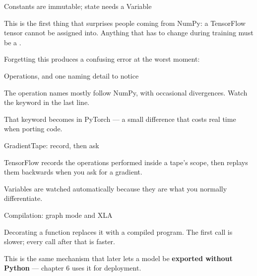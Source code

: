 \documentclass[aspectratio=169,11pt,t]{beamer}
\begin{document}

\begin{frame}[shrink=25]{Constants are immutable; state needs a Variable}
{\fontsize{9.4}{12.6}\selectfont\color{fg2}This is the first thing that surprises people coming from NumPy: a TensorFlow tensor cannot be assigned into. Anything that has to change during training must be a .\par}\vskip 4pt
\begin{iband}[amber]
Forgetting this produces a confusing error at the worst moment: 
\end{iband}
\end{frame}

\begin{frame}[shrink=25]{Operations, and one naming detail to notice}
{\fontsize{9.4}{12.6}\selectfont\color{fg2}The operation names mostly follow NumPy, with occasional divergences. Watch the keyword in the last line.\par}\vskip 4pt
{\fontsize{9.4}{12.6}\selectfont\color{fg2}That  keyword becomes  in PyTorch --- a small difference that costs real time when porting code.\par}\vskip 4pt
\end{frame}

\begin{frame}[shrink=25]{GradientTape: record, then ask}
{\fontsize{9.4}{12.6}\selectfont\color{fg2}TensorFlow records the operations performed inside a tape's scope, then replays them backwards when you ask for a gradient.\par}\vskip 4pt
\begin{iband}[signal]
Variables are watched automatically because they are what you normally differentiate. 
\end{iband}
\end{frame}

\begin{frame}[shrink=25]{Compilation: graph mode and XLA}
{\fontsize{9.4}{12.6}\selectfont\color{fg2}Decorating a function replaces it with a compiled program. The first call is slower; every call after that is faster.\par}\vskip 4pt
{\fontsize{9.4}{12.6}\selectfont\color{fg2}This is the same mechanism that later lets a model be \textbf{exported without Python} --- chapter 6 uses it for deployment.\par}\vskip 4pt
\end{frame}
\end{document}

